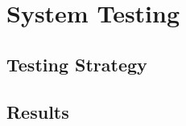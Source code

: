 
\chapter{System Testing}\label{systest}


\section{Testing Strategy}\label{systest/strategy}



\section{Results}\label{systest/results}
